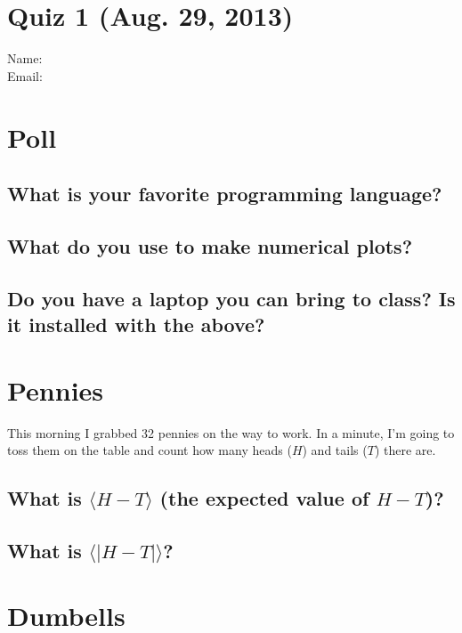 \documentclass[11pt]{article}
\begin{document}
\pagestyle{empty}
\parindent=0pt

\section*{\centering Quiz 1 (Aug. 29, 2013)}

{\large
Name:\\
Email:\\
}

\section{Poll}
\subsection{What is your favorite programming language?}
\vspace{0.25in}
\subsection{What do you use to make numerical plots?}
\vspace{0.25in}
\subsection{Do you have a laptop you can bring to class? Is it installed with the above?}
\vspace{0.25in}

\section{Pennies}

This morning I grabbed 32 pennies on the way to work.  In a minute, I'm going
to toss them on the table and count how many heads ($H$) and tails ($T$) there are.

\subsection{What is $\langle H-T\rangle$ (the expected value of $H-T$)?}
\vspace{0.25in}
\subsection{What is $\langle|H-T|\rangle$?}
\vspace{0.25in}

\section{Dumbells}
\end{document}
